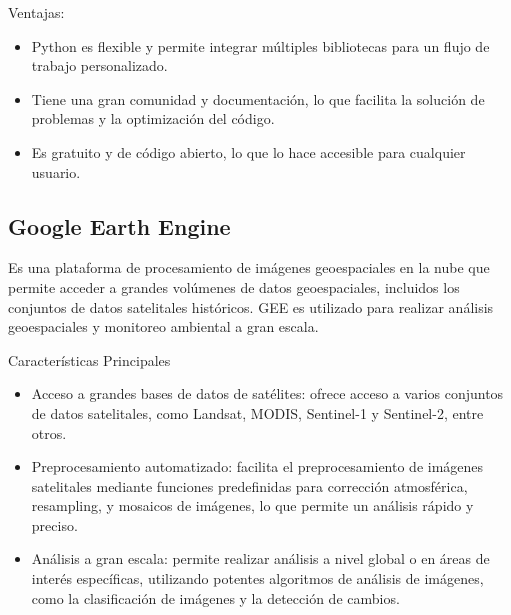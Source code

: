 Ventajas:

\begin{itemize}
	\item Python es flexible y permite integrar múltiples bibliotecas para un flujo de trabajo personalizado.
	\item Tiene una gran comunidad y documentación, lo que facilita la solución de problemas y la optimización del código.
	\item Es gratuito y de código abierto, lo que lo hace accesible para cualquier usuario. 
\end{itemize}

\subsection{Google Earth Engine}

Es una plataforma de procesamiento de imágenes geoespaciales en la nube que permite acceder a grandes 
volúmenes de datos geoespaciales, incluidos los conjuntos de datos satelitales históricos. GEE es utilizado
para realizar análisis geoespaciales y monitoreo ambiental a gran escala.

Características Principales

\begin{itemize}
	\item Acceso a grandes bases de datos de satélites: ofrece acceso a varios conjuntos de datos satelitales,
	 como Landsat, MODIS, Sentinel-1 y Sentinel-2, entre otros.
	\item Preprocesamiento automatizado: facilita el preprocesamiento de imágenes satelitales mediante funciones predefinidas
	 para corrección atmosférica, resampling, y mosaicos de imágenes, lo que permite un análisis rápido y 
	 preciso.
	\item Análisis a gran escala: permite realizar análisis a nivel global o en áreas de interés específicas,
	 utilizando potentes algoritmos de análisis de imágenes, como la clasificación de imágenes y la detección 
	 de cambios.
\end{itemize}




